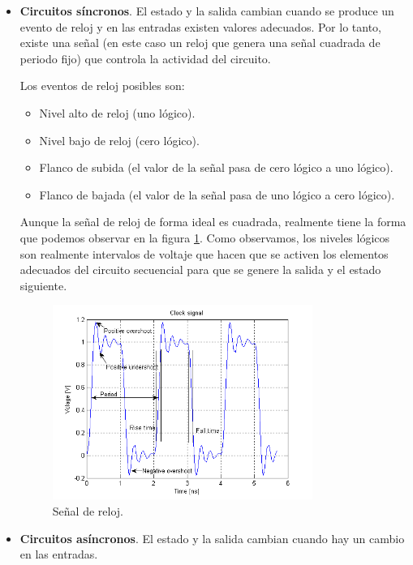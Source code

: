 \documentclass[a4paper, 11pt, titlepage]{article}
\begin{document}
	\begin{itemize}
		\item \textbf{Circuitos síncronos}. El estado y la salida cambian cuando se produce un evento de reloj
		y en las entradas existen valores adecuados. Por lo tanto, existe una señal (en este caso un reloj que 
		genera una señal cuadrada de periodo fijo) que controla la actividad del circuito.

		Los eventos de reloj posibles son:

		\begin{itemize}
			\item Nivel alto de reloj (uno lógico).
			\item Nivel bajo de reloj (cero lógico).
			\item Flanco de subida (el valor de la señal pasa de cero lógico a uno lógico).
			\item Flanco de bajada (el valor de la señal pasa de uno lógico a cero lógico).
		\end{itemize}

		Aunque la señal de reloj de forma ideal es cuadrada, realmente tiene la forma que podemos observar 
		en la figura \ref{clocksignal}. Como observamos, los niveles lógicos son realmente intervalos de 
		voltaje que hacen que se activen los elementos adecuados del circuito secuencial para que se genere 
		la salida y el estado siguiente.

		\begin{figure}[htp]
			\centering
			\includegraphics[width=0.8\textwidth]{resources/clocksignal.png}
			\caption{Señal de reloj.}
			\label{clocksignal}
		\end{figure}
	
		\item \textbf{Circuitos asíncronos}. El estado y la salida cambian cuando hay un cambio en las entradas.
	\end{itemize}
\end{document}
